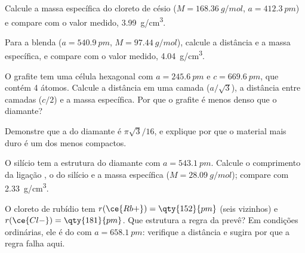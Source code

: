 \begin{exercise}[$\star\star$]\label{exo:b1:crystals-ionic-covalent:7}
Calcule a massa específica do cloreto de césio ($M = \qty{168.36}{g/mol}$,
$a = \qty{412.3}{pm}$) e compare com o valor medido, \qty{3.99}{g/cm^3}.
\end{exercise}

\begin{exercise}[$\star\star$]\label{exo:b1:crystals-ionic-covalent:8}
Para a blenda ($a = \qty{540.9}{pm}$, $M = \qty{97.44}{g/mol}$), calcule
a distância  e a massa específica, e compare com o valor medido,
\qty{4.04}{g/cm^3}.
\end{exercise}

\begin{exercise}[$\star\star$]\label{exo:b1:crystals-ionic-covalent:9}
O grafite tem uma célula hexagonal com $a = \qty{245.6}{pm}$ e
$c = \qty{669.6}{pm}$, que contém 4 átomos. Calcule a distância 
em uma camada ($a/\sqrt3$), a distância entre camadas ($c/2$) e a massa
específica. Por que o grafite é menos denso que o diamante?
\end{exercise}

\begin{exercise}[$\star\star\star$]\label{exo:b1:crystals-ionic-covalent:10}
Demonstre que a  do diamante é $\pi\sqrt3/16$, e explique por
que o material mais duro é um dos menos compactos.
\end{exercise}

\begin{exercise}[$\star\star\star$]\label{exo:b1:crystals-ionic-covalent:11}
O silício tem a estrutura do diamante com $a = \qty{543.1}{pm}$. Calcule
o comprimento da ligação , o  do silício e a
massa específica ($M = \qty{28.09}{g/mol}$); compare com \qty{2.33}{g/cm^3}.
\end{exercise}

\begin{exercise}[$\star\star\star$]\label{exo:b1:crystals-ionic-covalent:12}
O cloreto de rubídio tem $r(\ce{Rb+}) = \qty{152}{pm}$ (seis vizinhos) e
$r(\ce{Cl-}) = \qty{181}{pm}$. Que estrutura a regra da 
prevê? Em condições ordinárias, ele é do  com
$a = \qty{658.1}{pm}$: verifique a distância  e sugira por que
a regra falha aqui.
\end{exercise}

